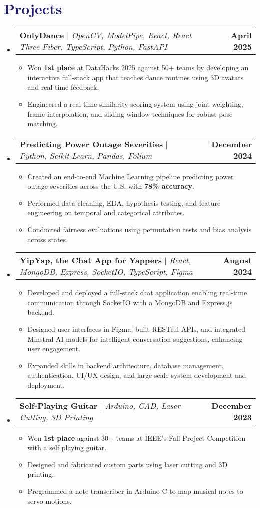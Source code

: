 \documentclass[letterpaper,11pt]{article}
\makeatletter
\newcommand{\resumeItem}[1]{
  \item\small{
    {#1 \vspace{-2pt}}
  }
}
\newcommand{\resumeProjectHeading}[2]{
    \item
    \begin{tabular*}{1.001\textwidth}{l@{\extracolsep{\fill}}r}
      \small#1 & \textbf{\small #2}\\
    \end{tabular*}\vspace{-7pt}
}
\newcommand{\resumeSubHeadingListStart}{\begin{itemize}[leftmargin=0.0in, label={}]}
\newcommand{\resumeSubHeadingListEnd}{\end{itemize}}
\newcommand{\resumeItemListStart}{\begin{itemize}}
\newcommand{\resumeItemListEnd}{\end{itemize}\vspace{-5pt}}
\newcommand\accentColor{MidnightBlue}
\makeatother
\begin{document}
\section{\textcolor{\accentColor}{Projects}}
\resumeSubHeadingListStart
\resumeProjectHeading
    {\textbf{OnlyDance} $|$ \emph{OpenCV, ModelPipe, React, React Three Fiber, TypeScript, Python, FastAPI}}{April 2025}
    \resumeItemListStart
        \resumeItem{Won \textbf{1st place} at DataHacks 2025 against 50+ teams by developing an interactive full-stack app that teaches dance routines using 3D avatars and real-time feedback.}
        \resumeItem{Engineered a real-time similarity scoring system using joint weighting, frame interpolation, and sliding window techniques for robust pose matching.}
    \resumeItemListEnd
\vspace{-15pt}
\resumeProjectHeading
    {\textbf{Predicting Power Outage Severities} $|$ \emph{Python, Scikit-Learn, Pandas, Folium}}{December 2024}
    \resumeItemListStart
        \resumeItem{Created an end-to-end Machine Learning pipeline predicting power outage severities across the U.S. with \textbf{78\% accuracy}.}
        \resumeItem{Performed data cleaning, EDA, hypothesis testing, and feature engineering on temporal and categorical attributes.}
        \resumeItem{Conducted fairness evaluations using permutation tests and bias analysis across states.}
    \resumeItemListEnd
\vspace{-15pt}
\resumeProjectHeading
    {\textbf{YipYap, the Chat App for Yappers} $|$ \emph{React, MongoDB, Express, SocketIO, TypeScript, Figma}}{August 2024}
    \resumeItemListStart
        \resumeItem{Developed and deployed a full-stack chat application enabling real-time communication through SocketIO with a MongoDB and Express.js backend.}
        \resumeItem{Designed user interfaces in Figma, built RESTful APIs, and integrated Minstral AI models for intelligent conversation suggestions, enhancing user engagement.}
        \resumeItem{Expanded skills in backend architecture, database management, authentication, UI/UX design, and large-scale system development and deployment.}
    \resumeItemListEnd
\vspace{-15pt}
\resumeProjectHeading
    {\textbf{Self-Playing Guitar} $|$ \emph{Arduino, CAD, Laser Cutting, 3D Printing}}{December 2023}
    \resumeItemListStart
        \resumeItem{Won \textbf{1st place} against 30+ teams at IEEE's Fall Project Competition with a self playing guitar.}
        \resumeItem{Designed and fabricated custom parts using laser cutting and 3D printing.}
        \resumeItem{Programmed a note transcriber in Arduino C to map musical notes to servo motions.}
    \resumeItemListEnd
\resumeSubHeadingListEnd
\vspace{-15pt}
\end{document}
